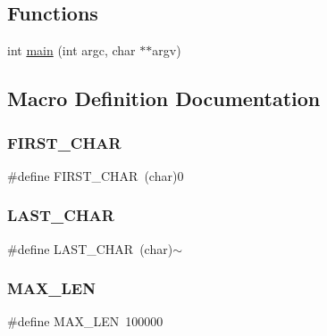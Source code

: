 \subsection*{Functions}
\begin{DoxyCompactItemize}
\item 
int \mbox{\hyperlink{adat-devel_2other__libs_2filedb_2filehash_2twrite_8c_a3c04138a5bfe5d72780bb7e82a18e627}{main}} (int argc, char $\ast$$\ast$argv)
\end{DoxyCompactItemize}


\subsection{Macro Definition Documentation}
\mbox{\label{adat-devel_2other__libs_2filedb_2filehash_2twrite_8c_af1c5fd90d1b8a22169133f549223f2e1}} 
\subsubsection{\texorpdfstring{FIRST\_CHAR}{FIRST\_CHAR}}
{\footnotesize\ttfamily \#define F\+I\+R\+S\+T\+\_\+\+C\+H\+AR~(char)\textquotesingle{}0\textquotesingle{}}

\mbox{\label{adat-devel_2other__libs_2filedb_2filehash_2twrite_8c_a31911f021a0d09eed9a5269d0648dfde}} 
\subsubsection{\texorpdfstring{LAST\_CHAR}{LAST\_CHAR}}
{\footnotesize\ttfamily \#define L\+A\+S\+T\+\_\+\+C\+H\+AR~(char)\textquotesingle{}$\sim$\textquotesingle{}}

\mbox{\label{adat-devel_2other__libs_2filedb_2filehash_2twrite_8c_aabf4f709c8199e41cf279c77112345fe}} 
\subsubsection{\texorpdfstring{MAX\_LEN}{MAX\_LEN}}
{\footnotesize\ttfamily \#define M\+A\+X\+\_\+\+L\+EN~100000}

